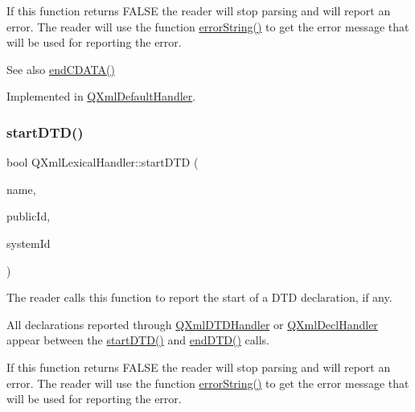 If this function returns F\+A\+L\+SE the reader will stop parsing and will report an error. The reader will use the function \mbox{\hyperlink{class_q_xml_lexical_handler_a2b1fdd6448b6a07b2af197fd3aca60d3}{error\+String()}} to get the error message that will be used for reporting the error.

\begin{DoxySeeAlso}{See also}
\mbox{\hyperlink{class_q_xml_lexical_handler_af318cf25fa252c8bf7a4e8d2c4b26350}{end\+C\+D\+A\+T\+A()}} 
\end{DoxySeeAlso}


Implemented in \mbox{\hyperlink{class_q_xml_default_handler_ae6df0d67f6537d36d5d2b0261e2251aa}{Q\+Xml\+Default\+Handler}}.

\mbox{\label{class_q_xml_lexical_handler_a1bdcb91e384a32b218d04304e1116808}} 
\subsubsection{\texorpdfstring{startDTD()}{startDTD()}}
{\footnotesize\ttfamily bool Q\+Xml\+Lexical\+Handler\+::start\+D\+TD (\begin{DoxyParamCaption}\item[{const \mbox{\hyperlink{class_q_string}{Q\+String}} \&}]{name,  }\item[{const \mbox{\hyperlink{class_q_string}{Q\+String}} \&}]{public\+Id,  }\item[{const \mbox{\hyperlink{class_q_string}{Q\+String}} \&}]{system\+Id }\end{DoxyParamCaption})\hspace{0.3cm}{\ttfamily [pure virtual]}}

The reader calls this function to report the start of a D\+TD declaration, if any.

All declarations reported through \mbox{\hyperlink{class_q_xml_d_t_d_handler}{Q\+Xml\+D\+T\+D\+Handler}} or \mbox{\hyperlink{class_q_xml_decl_handler}{Q\+Xml\+Decl\+Handler}} appear between the \mbox{\hyperlink{class_q_xml_lexical_handler_a1bdcb91e384a32b218d04304e1116808}{start\+D\+T\+D()}} and \mbox{\hyperlink{class_q_xml_lexical_handler_a7f5188d7a0a54b6c276c5e7e2faa72bc}{end\+D\+T\+D()}} calls.

If this function returns F\+A\+L\+SE the reader will stop parsing and will report an error. The reader will use the function \mbox{\hyperlink{class_q_xml_lexical_handler_a2b1fdd6448b6a07b2af197fd3aca60d3}{error\+String()}} to get the error message that will be used for reporting the error.

